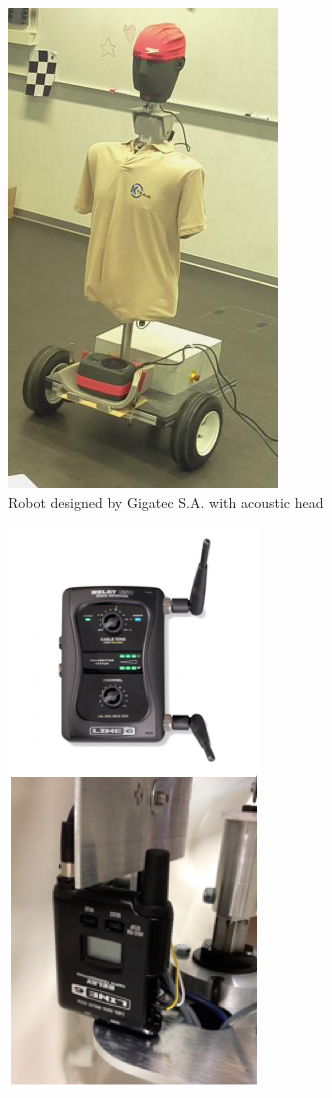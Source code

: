 \begin{figure}
    \centering
    \begin{subfigure}{0.3\linewidth}
        \centering
        \includegraphics[height=0.3\textheight]{files/Robot2_cvt.png}
        \caption{Robot designed by Gigatec S.A. with acoustic head}
        \label{fig:robot}
    \end{subfigure}
    \hspace{0.5em}
    \begin{subfigure}{0.3\linewidth}
        \centering
        \includegraphics[height=0.3\textheight]{files/Wireless.png}

\end{subfigure}
\end{figure}
